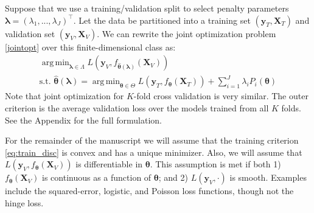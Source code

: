 \documentclass[12pt]{article}
\DeclareMathOperator*{\argmin}{arg\,min}
\begin{document}
Suppose that we use a training/validation split to select penalty parameters $\boldsymbol{\lambda} = (\lambda_1, ..., \lambda_J)^\top$. Let the data be partitioned into a training set $(\boldsymbol{y}_T , \boldsymbol{X}_T)$ and validation set $(\boldsymbol{y}_V, \boldsymbol{X}_V)$. We can rewrite the joint optimization problem \eqref{jointopt} over this finite-dimensional class as:
\begin{equation}
\begin{array}{c}
\argmin_{\boldsymbol{\lambda} \in \Lambda} L(\boldsymbol{y}_V, f_{\hat{\boldsymbol \theta}(\boldsymbol{\lambda})}(\boldsymbol{X}_V)) \\
\text{s.t. } {\hat{\boldsymbol \theta}(\boldsymbol{\lambda})} = \argmin_{\boldsymbol \theta \in \Theta} L(\boldsymbol{y}_T, f_{\boldsymbol \theta} (\boldsymbol{X}_T)) + \sum\limits_{i=1}^J \lambda_i P_i(\boldsymbol \theta)
\end{array}
\label{jointopt2}
\end{equation}
Note that joint optimization for $K$-fold cross validation is very similar. The outer criterion is the average validation loss over the models trained from all $K$ folds. See the Appendix for the full formulation.

For the remainder of the manuscript we will assume that the training criterion \eqref{eq:train_disc} is convex and has a unique minimizer. Also, we will assume that $L \left( \boldsymbol{y}_V, f_{\boldsymbol \theta}(\boldsymbol{X}_V) \right)$ is differentiable in $\boldsymbol \theta$. This assumption is met if both 1) $f_{\boldsymbol \theta}(\boldsymbol{X}_V)$ is continuous as a function of $\boldsymbol \theta$; and 2) $L\left(\boldsymbol{y}_V,\cdot\right)$ is smooth. Examples include the squared-error, logistic, and Poisson loss functions, though not the hinge loss.
\end{document}

